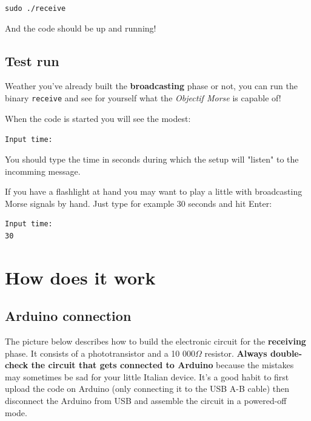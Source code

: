 \documentclass[12pt]{report}
\begin{document}
\begin{snugshade}
\verb|sudo ./receive|
\end{snugshade}

And the code should be up and running!

\subsection{Test run}

Weather you've already built the \textbf{broadcasting} phase or not, you can run the binary \verb|receive| and see for yourself what the \textit{Objectif Morse} is capable of!

When the code is started you will see the modest:

\begin{snugshade}
\verb|Input time:|
\end{snugshade}

You should type the time in seconds during which the setup will "listen" to the incomming message.

If you have a flashlight at hand you may want to play a little with broadcasting Morse signals by hand. Just type for example 30 seconds and hit Enter:

\begin{snugshade}
\begin{verbatim}
Input time:
30
\end{verbatim}
\end{snugshade}


\section{How does it work}





\subsection{Arduino connection}

The picture below describes how to build the electronic circuit for the \textbf{receiving} phase. It consists of a phototransistor and a 10 000$\Omega$ resistor. \textbf{Always double-check the circuit that gets connected to Arduino} because the mistakes may sometimes be sad for your little Italian device. It's a good habit to first upload the code on Arduino (only connecting it to the USB A-B cable) then disconnect the Arduino from USB and assemble the circuit in a powered-off mode.
\end{document}
